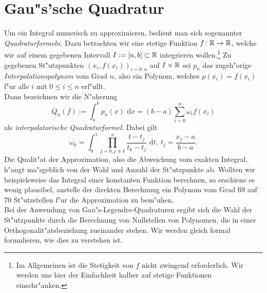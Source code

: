 \section{Gau"s'sche Quadratur}

Um ein Integral numerisch zu approximieren, bedient man sich sogenannter \emph{Quadraturformeln}. Dazu betrachten wir eine stetige Funktion $f\colon\mathbb{R}\to\mathbb{R}$, welche wir auf einem gegebenen Intervall $I:=[a,b]\subset\mathbb{R}$ integrieren wollen.\footnote{Im Allgemeinen ist die Stetigkeit von $f$ nicht zwingend erforderlich. Wir werden uns hier der Einfachheit halber auf stetige Funktionen einschr"anken.}
Zu gegebenen St"utzpunkten $(x_i, f(x_i))_{i=0:n}$ auf $I\times\mathbb{R}$ sei $p_n$ das zugeh"orige \emph{Interpolationspolynom} vom Grad $n$, also ein Polynom, welches $p(x_i) = f(x_i)$ f"ur alle $i$ mit $0\le i\le n$ erf"ullt.\\

Dann bezeichnen wir die N"aherung
\begin{equation}\label{eq:quadratur}
Q_n(f) := \int_a^b p_n (x)\text{ d}x =
(b-a)\sum_{i=0}^n \omega_i f(x_i)
\end{equation}
als \emph{interpolatorische Quadraturformel}. Dabei gilt
\[
\omega_k = \int_0^1 \prod_{j=0,j\neq k}^n
\frac{t-t_j}{t_k - t_j} \text{ d}t, \ t_j
= \frac{x_j-a}{b-a}.
\]
Die Qualit"at der Approximation, also die Abweichung vom exakten Integral, h"angt ma"sgeblich von der Wahl und Anzahl der St"utzpunkte ab. Wollten wir
beispielsweise das Integral einer konstanten Funktion berechnen, so erschiene es wenig plausibel, anstelle der direkten Berechnung ein Polynom vom Grad 69 auf 70 St"utzstellen f"ur die Approximation zu bem"uhen.\\

Bei der Anwendung von Gau"s-Legendre-Quadraturen ergibt sich die Wahl der St"utzpunkte durch die Berechnung von Nullstellen von Polynomen, die in einer Orthogonalit"atsbeziehung zueinander stehen.
Wir werden gleich formal formulieren, wie dies zu verstehen ist.\\

